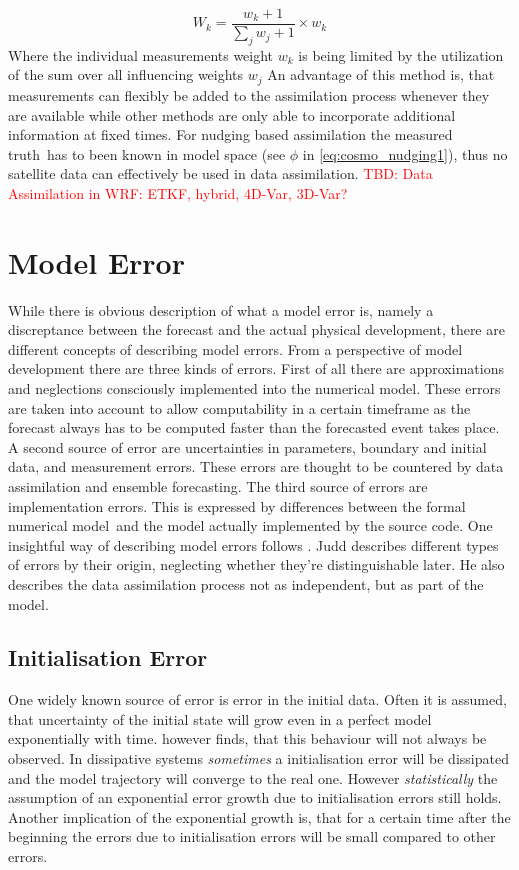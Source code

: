 \begin{equation} 
W_k=\frac{w_k+1}{\sum_j w_j+1}\times w_k \label{eq:cosmo_nudging2}
 \end{equation}
\p
Where the individual measurements weight $w_k$ is being limited by the utilization of the sum over all influencing weights $w_j$
\p
An advantage of this method is, that measurements can flexibly be added to the assimilation process whenever they are available while other methods are only able to incorporate additional information at fixed times.
\p
For nudging based assimilation the measured \glqq truth\grqq\ has to been known in model space (see \(\phi\) in \ref{eq:cosmo_nudging1}), thus no satellite data can effectively be used in data assimilation.
\p
\textcolor{red}{TBD: Data Assimilation in WRF: ETKF, hybrid, 4D-Var, 3D-Var?}
\section{Model Error}
While there is obvious description of what a model error is, namely a discreptance between the forecast and the actual physical development, there are different concepts of describing model errors.
\p
From a perspective of model development there are three kinds of errors. First of all there are approximations and neglections consciously implemented into the numerical model. These errors are taken into account to allow computability in a certain timeframe as the forecast always has to be computed faster than the forecasted event takes place. A second source of error are uncertainties in parameters, boundary and initial data, and measurement errors. These errors are thought to be countered by data assimilation and ensemble forecasting. The third source of errors are implementation errors. This is expressed by differences between the formal \glqq numerical model\grqq\ and the model actually implemented by the source code.
\p                                
One insightful way of describing model errors follows \cite{judd2008geometry}. Judd describes different types of errors by their origin, neglecting whether they're distinguishable later. He also describes the data assimilation process not as independent, but as part of the model.
\subsection{Initialisation Error}
\p
One widely known source of error is error in the initial data. Often it is assumed, that uncertainty of the initial state will grow even in a perfect model exponentially with time. \cite{smith1999uncertainty} however finds, that this behaviour will not always be observed. 
\p In dissipative systems \emph{sometimes} a initialisation error will be dissipated and the model trajectory will converge to the real one. However \emph{statistically} the assumption of an exponential error growth due to initialisation errors still holds.
\p
Another implication of the exponential growth is, that for a certain time after the beginning the errors due to initialisation errors will be small compared to other errors.
